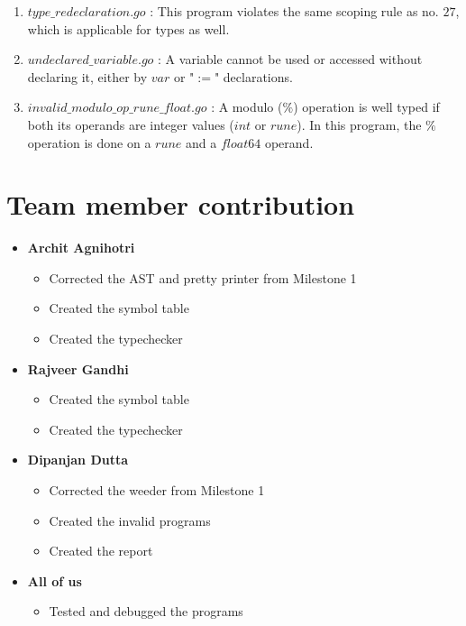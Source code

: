 \documentclass[preprint,12pt]{elsarticle}
\begin{document}
\begin{enumerate}
\item $type\_redeclaration.go$ : This program violates the same scoping rule as no. $27$, which is applicable for types as well.

\item $undeclared\_variable.go$ : A variable cannot be used or accessed without declaring it, either by $var$ or "$:=$" declarations.

\item $invalid\_modulo\_op\_rune\_float.go$ : A modulo ($\%$) operation is well typed if both its operands are integer values ($int$ or $rune$). In this program, the $\%$ operation is done on a $rune$ and a $float64$ operand.
\end{enumerate}

\section{Team member contribution}
\begin{itemize}
\item \textbf{Archit Agnihotri}
\begin{itemize}
\item Corrected the AST and pretty printer from Milestone 1
\item Created the symbol table
\item Created the typechecker
\end{itemize}
\item \textbf{Rajveer Gandhi}
\begin{itemize}
\item Created the symbol table
\item Created the typechecker
\end{itemize}
\item \textbf{Dipanjan Dutta}
\begin{itemize}
\item Corrected the weeder from Milestone 1
\item Created the invalid programs
\item Created the report
\end{itemize}
\item \textbf{All of us}
\begin{itemize}
\item Tested and debugged the programs
\end{itemize}
\end{itemize}






\end{document}
